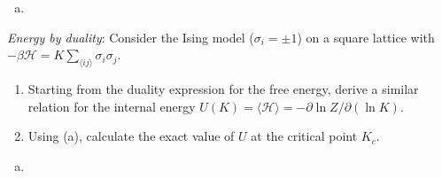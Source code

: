 \begin{solution}
    \begin{enumerate}[(a)]
        \item
    \end{enumerate}
\end{solution}

\begin{problem}
    \textit{Energy by duality}: Consider the Ising model ($\sigma_i = \pm 1$) on a square lattice with $-\beta\mathcal{H} = K\sum_{\langle ij\rangle}\sigma_i\sigma_j$.

    \begin{enumerate}
        \item[(a)] Starting from the duality expression for the free energy, derive a similar relation for the internal energy $U(K) = \langle\mathcal{H}\rangle = -\partial\ln Z/\partial(\ln K)$.

        \item[(b)] Using (a), calculate the exact value of $U$ at the critical point $K_c$.
    \end{enumerate}
\end{problem}

\begin{solution}
    \begin{enumerate}[(a)]
        \item
    \end{enumerate}
\end{solution}

